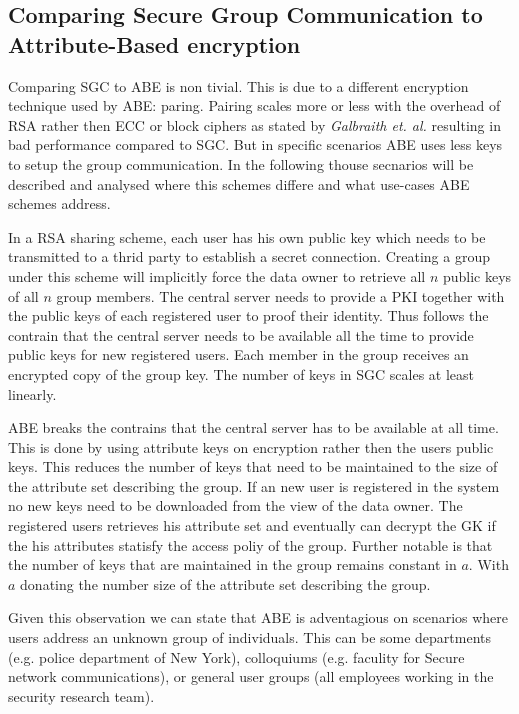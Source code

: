 \subsection{Comparing Secure Group Communication to Attribute-Based encryption}
Comparing SGC to ABE is non tivial. This is due to a different encryption technique used by ABE: paring. Pairing scales more or less with the overhead of RSA rather then ECC or block ciphers as stated by \textit{Galbraith et. al.} \cite{galbraith2008pairings} resulting in bad performance compared to SGC. But in specific scenarios ABE uses less keys to setup the group communication. In the following thouse secnarios will be described and analysed where this schemes differe and what use-cases ABE schemes address.

In a RSA sharing scheme, each user has his own public key which needs to be transmitted to a thrid party to establish a secret connection. Creating a group under this scheme will implicitly force the data owner to retrieve all $n$ public keys of all $n$ group members. The central server needs to provide a PKI together with the public keys of each registered user to proof their identity. Thus follows the contrain that the central server needs to be available all the time to provide public keys for new registered users. Each member in the group receives an encrypted copy of the group key. The number of keys in SGC scales at least linearly. 

ABE breaks the contrains that the central server has to be available at all time. This is done by using attribute keys on encryption rather then the users public keys. This reduces the number of keys that need to be maintained to the size of the attribute set describing the group. If an new user is registered in the system no new keys need to be downloaded from the view of the data owner. The registered users retrieves his attribute set and eventually can decrypt the GK if the his attributes statisfy the access poliy of the group. Further notable is that the number of keys that are maintained in the group remains constant in $a$. With $a$ donating the number size of the attribute set describing the group. 

Given this observation we can state that ABE is adventagious on scenarios where users address an unknown group of individuals. This can be some departments (e.g. police department of New York), colloquiums (e.g. faculity for Secure network communications), or general user groups (all employees working in the security research team).


